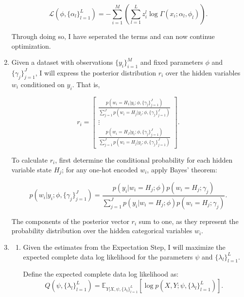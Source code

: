 \documentclass[submit]{harvardml}
\begin{document}
\begin{enumerate}
\begin{equation}
    \mathcal{L}(\phi, \{\alpha_l\}_{l=1}^L) = -\sum_{i=1}^M \left( \sum_{l=1}^L z_i^l \log \Gamma(x_i; \alpha_l, \phi_l) \right).
\end{equation}

Through doing so, I have seperated the terms and can now continue optimization. 
  \item Given a dataset with observations $\{y_i\}_{i=1}^M$ and fixed parameters $\phi$ and $\{\gamma_j\}_{j=1}^J$, I will express the posterior distribution $r_i$ over the hidden variables $w_i$ conditioned on $y_i$. That is,

\begin{equation}
r_i = 
\begin{bmatrix}
\frac{p(w_i = H_1 | y_i; \phi, \{\gamma_j\}_{j=1}^J)}{\sum_{j=1}^J p(w_i = H_j | y_i; \phi, \{\gamma_j\}_{j=1}^J)} \\
\vdots \\
\frac{p(w_i = H_J | y_i; \phi, \{\gamma_j\}_{j=1}^J)}{\sum_{j=1}^J p(w_i = H_j | y_i; \phi, \{\gamma_j\}_{j=1}^J)}
\end{bmatrix}.
\end{equation}

To calculate $r_i$, first determine the conditional probability for each hidden variable state $H_j$; for any one-hot encoded $w_i$, apply Bayes' theorem:

\begin{equation}
p(w_i | y_i; \phi, \{\gamma_j\}_{j=1}^J) = \frac{p(y_i | w_i = H_j; \phi) p(w_i = H_j; \gamma_j)}{\sum_{j=1}^J p(y_i | w_i = H_j; \phi) p(w_i = H_j; \gamma_j)}.
\end{equation}

The components of the posterior vector $r_i$ sum to one, as they represent the probability distribution over the hidden categorical variables $w_i$.
  \item \begin{enumerate}
      \item Given the estimates from the Expectation Step, I will maximize the expected complete data log likelihood for the parameters \( \psi \) and \( \{\lambda_l\}_{l=1}^L \).

Define the expected complete data log likelihood as:
\begin{equation}
    Q(\psi, \{\lambda_l\}_{l=1}^L) = \mathbb{E}_{Y|X, \psi, \{\lambda_l\}_{l=1}^L}[\log p(X, Y; \psi, \{\lambda_l\}_{l=1}^L)].
\end{equation}


\end{enumerate}
\end{enumerate}
\end{document}
